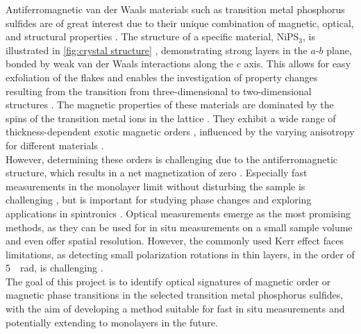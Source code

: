 \documentclass[
	twoside,
	parskip=half,
	a4paper,
]{scrbook}
\begin{document}
Antiferromagnetic van der Waals materials such as transition metal phosphorus sulfides are of great interest due to their unique combination of magnetic, optical, and structural properties \cite{MPX_review,MPS_magnetism}. 
The structure of a specific material, NiPS$_3$, is illustrated in \autoref{fig:crystal structure} \cite{NiPS3_coherent}, demonstrating strong layers in the $a$-$b$ plane, bonded by weak van der Waals interactions along the $c$ axis.
This allows for easy exfoliation of the flakes and enables the investigation of property changes resulting from the transition from three-dimensional to two-dimensional structures \cite{MPX_review}.
The magnetic properties of these materials are dominated by the spins of the transition metal ions in the lattice \cite{MPS_magnetism}.
They exhibit a wide range of thickness-dependent exotic magnetic orders \cite{AFM_review}, influenced by the varying anisotropy for different materials \cite{MPS_magnetism, CrPS4_magnetic}.\\
However, determining these orders is challenging due to the antiferromagnetic structure, which results in a net magnetization of zero \cite{MPS_magnetism}.
Especially fast measurements in the monolayer limit without disturbing the sample is challenging \cite{AFM_review, CrPS4_magnetic}, but is important for studying phase changes and exploring applications in spintronics \cite{AFM_review}.
Optical measurements emerge as the most promising methods, as they can be used for in situ measurements on a small sample volume and even offer spatial resolution. 
However, the commonly used Kerr effect faces limitations, as detecting small polarization rotations in thin layers, in the order of \SI{5}{\mu rad}, is challenging \cite{AFM_review}.\\
The goal of this project is to identify optical signatures of magnetic order or magnetic phase transitions in the selected transition metal phosphorus sulfides, with the aim of developing a method suitable for fast in situ measurements and potentially extending to monolayers in the future.
\end{document}
